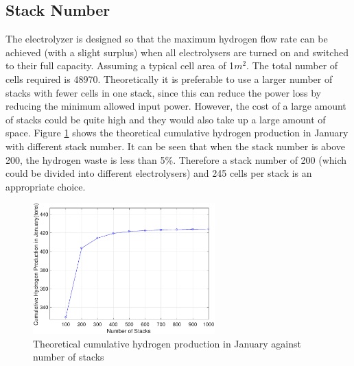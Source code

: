 \documentclass[11pt, a4paper]{article}
\begin{document}
\subsection{Stack Number}
The electrolyzer is designed so that the maximum hydrogen flow rate can be achieved (with a slight surplus) when all electrolysers are turned on and switched to their full capacity. 
Assuming a typical cell area of 1$m^2$. The total number of cells required is 48970. Theoretically it is preferable to use a larger number of stacks with fewer cells in one stack, since this can reduce the power loss by reducing the minimum allowed input power. However,  the cost of a large amount of stacks could be quite high and they would also take up a large amount of space. Figure \ref{fig:stack} shows the theoretical cumulative hydrogen production in January with different stack number. It can be seen that when the stack number is above 200, the hydrogen waste is less than 5\%. Therefore a stack number of 200 (which could be divided into different electrolysers) and  245 cells per stack is an appropriate choice.
 \begin{figure}[H] 
 \centering
\includegraphics[width=7cm]{stack.eps}
\caption{Theoretical cumulative hydrogen production in January against number of stacks}
\label{fig:stack}
\end{figure}
 
\end{document}
